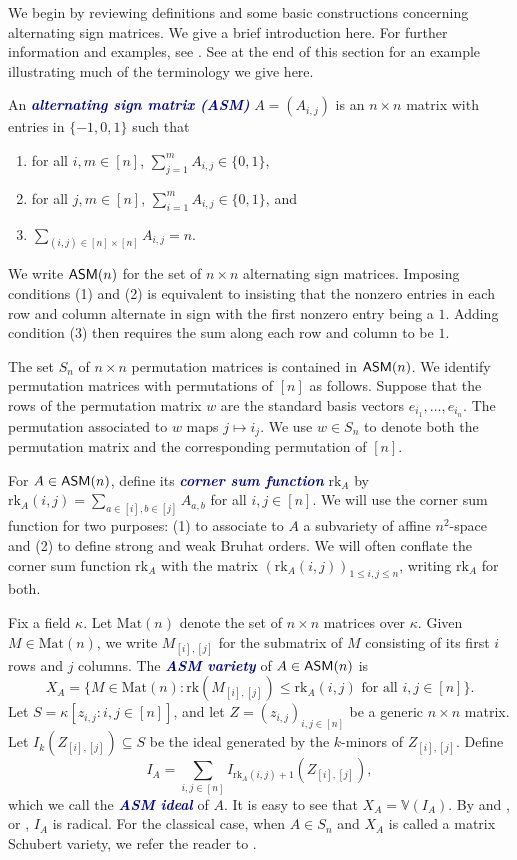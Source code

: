 \documentclass[12 pt]{amsart}
\newcommand{\newword}[1]{\textcolor{darkblue}{\textbf{\emph{#1}}}}
\numberwithin{equation}{section}
\newcommand{\rk}{\mathrm{rk}}
\newcommand{\Mat}{\mathrm{Mat}}
\newcommand{\field}{\kappa}
\theoremstyle{remark}
\newcommand{\asm}{{\sf ASM}}
\begin{document}
We begin by reviewing definitions and some basic constructions concerning alternating sign matrices.  We give a brief introduction here. For further information and examples, see \cite[Section 2]{EKW-main}. See  at the end of this section for an example illustrating much of the terminology we give here.

An \newword{alternating sign matrix (ASM)} $A = (A_{i,j})$ is an $n \times n$ matrix with entries in $\{-1,0,1\}$ such that
\begin{enumerate}
    \item for all $i,m \in [n]$, $\sum_{j=1}^m A_{i,j} \in \{0,1\}$,
    \item for all $j, m \in [n]$, $\sum_{i=1}^m A_{i,j} \in \{0,1\}$, and 
    \item $\sum_{(i,j) \in [n] \times [n]} A_{i,j} = n$.
\end{enumerate}  We write $\asm(n)$ for the set of $n\times n$ alternating sign matrices.  Imposing conditions (1) and (2) is equivalent to insisting that the nonzero entries in each row and column alternate in sign with the first nonzero entry being a $1$. Adding condition (3) then requires the sum along each row and column to be $1$.

The set $S_n$ of $n\times n$ permutation matrices is contained in $\asm(n)$.
We identify permutation matrices with permutations of $[n]$ as follows. 
Suppose that the rows of the permutation matrix $w$ are the standard basis vectors $e_{i_1},\ldots,e_{i_n}$. The permutation associated to $w$ maps $j\mapsto i_j$. We use $w\in S_n$ to denote both the permutation matrix and the corresponding permutation of $[n]$.

For $A \in\asm(n)$, define its \newword{corner sum function} $\rk_A$ by $\rk_A(i,j)=\sum_{a\in[i],b\in[j]} A_{a,b}$ for all $i,j\in[n]$. 
We will use the corner sum function for two purposes: (1) to associate to $A$ a subvariety of affine $n^2$-space and (2) to define strong and weak Bruhat orders.  We will often conflate the corner sum function $\rk_A$ with the matrix $(\rk_A(i,j))_{1\leq i,j\leq n}$, writing $\rk_A$ for both.

Fix a field $\field$. Let $\Mat(n)$ denote the set of $n\times n$ matrices over $\field$.  Given $M\in \Mat(n)$, we write $M_{[i],[j]}$ for the submatrix of $M$ consisting of its first $i$ rows and $j$ columns.
The \newword{ASM variety} of $A\in\asm(n)$ is 
\[
X_A=\{M\in \Mat(n) : \rk(M_{[i],[j]})\le \rk_A(i,j) \text{ for all } i,j\in[n]\}.
\]
Let $S=\field [z_{i,j} : i,j\in[n]]$, and let $Z=(z_{i,j})_{i,j\in[n]}$ be a generic $n \times n$ matrix.
Let $I_k(Z_{[i],[j]})\subseteq S$ be the ideal generated by the $k$-minors of $Z_{[i],[j]}$.  Define
\[
I_A = \sum_{i,j\in[n]}I_{\rk_A(i,j)+1}(Z_{[i],[j]}), 
\] which we call the \newword{ASM ideal} of $A$.  It is easy to see that $X_A = \mathbb{V}(I_A)$. By \cite[Section 7.2]{Knu09} and \cite[Lemma 5.9]{Wei17}, or \cite[Lemma 2.6]{KW23}, $I_A$ is  radical.  For the classical case, when $A \in S_n$ and $X_A$ is called a matrix Schubert variety, we refer the reader to \cite{Ful92, KM05}.  
\end{document}
